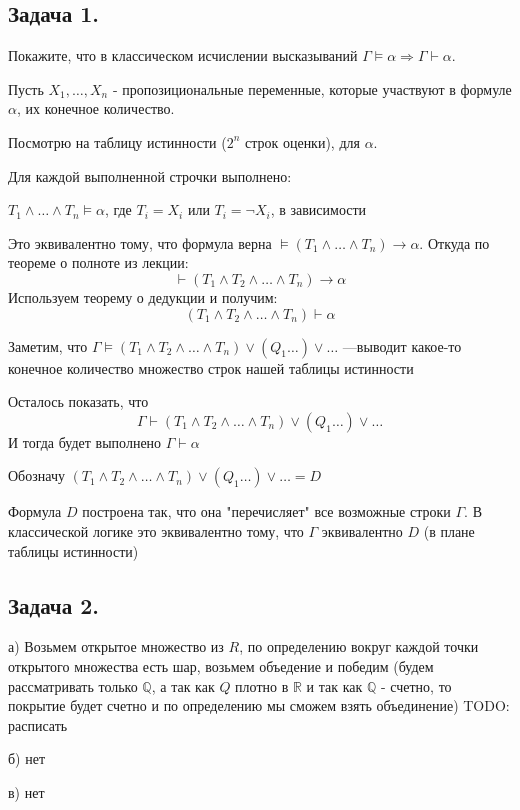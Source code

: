 \subsection{Задача 1.}

Покажите, что в классическом исчислении высказываний $\Gamma \models \alpha \Rightarrow \Gamma \vdash \alpha$.




Пусть $X_1,\ldots, X_n$ - пропозициональные переменные, которые участвуют в формуле $\alpha$, их конечное количество.

Посмотрю на таблицу истинности ($2^n$ строк оценки), для $\alpha$. 

Для каждой выполненной строчки выполнено:

$T_1 \land \ldots \land T_n \models \alpha$, где $T_i = X_i $ или $T_i = \neg X_i$, в зависимости


 Это эквивалентно тому, что формула  
 верна $\models (T_1 \land \dots \land T_n) \to \alpha$.  Откуда по теореме о полноте из лекции:
\[
\vdash(T_1 \land T_2 \land \dots \land T_n) \to \alpha
\]
Используем теорему о дедукции и получим:
\[
(T_1 \land T_2 \land \dots \land T_n) \vdash \alpha
\]



Заметим, что $\Gamma \models (T_1 \land T_2 \land \dots \land T_n) \lor (Q_1 \ldots) \lor \ldots$ ---выводит какое-то конечное количество множество строк нашей таблицы истинности

Осталось показать, что
\[
\Gamma \vdash (T_1 \land T_2 \land \dots \land T_n) \lor (Q_1 \ldots) \lor \ldots
\]
И тогда будет выполнено $\Gamma \vdash \alpha$

Обозначу $(T_1 \land T_2 \land \dots \land T_n) \lor (Q_1 \ldots) \lor \ldots =D$

Формула $D$ построена так, что она "перечисляет" все возможные строки $\Gamma$. В классической логике это эквивалентно тому, что $\Gamma$  эквивалентно $D$ (в плане таблицы истинности)


\newpage

\subsection{Задача 2.}

а) Возьмем открытое множество из $R$, по определению вокруг каждой точки открытого множества есть шар, возьмем объедение и победим (будем рассматривать только $\mathbb{Q}$, а так как $Q$ плотно в $\mathbb{R}$ и так как $\mathbb{Q}$ - счетно, то покрытие будет счетно и по определению мы сможем взять объединение) TODO: расписать


б) нет

в) нет